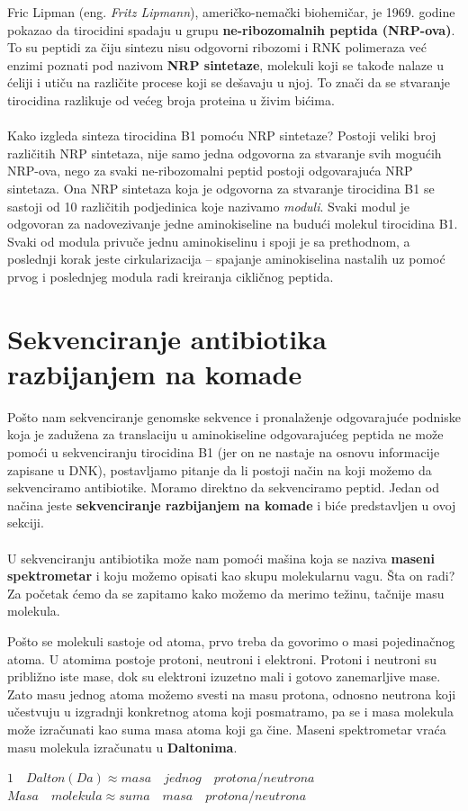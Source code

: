 Fric Lipman (eng. \textit{Fritz Lipmann}), američko-nemački biohemičar, je 1969. godine  pokazao da tirocidini spadaju u grupu \textbf{ne-ribozomalnih peptida (NRP-ova)}. To su peptidi za čiju sintezu nisu odgovorni ribozomi i RNK polimeraza već enzimi poznati pod nazivom \textbf{NRP sintetaze}, molekuli koji se takođe nalaze u ćeliji i utiču na različite procese koji se dešavaju u njoj. To znači da se stvaranje tirocidina razlikuje od većeg broja proteina u živim bićima. 
\\\\
\indent Kako izgleda sinteza tirocidina B1 pomoću NRP sintetaze? Postoji veliki broj različitih NRP sintetaza, nije samo jedna odgovorna za stvaranje svih mogućih NRP-ova, nego za svaki ne-ribozomalni peptid postoji odgovarajuća NRP sintetaza. Ona NRP sintetaza koja je odgovorna za stvaranje tirocidina B1 se sastoji od 10 različitih podjedinica koje nazivamo \textit{moduli}. Svaki modul je odgovoran za nadovezivanje jedne aminokiseline na budući molekul tirocidina B1. Svaki od modula privuče jednu aminokiselinu i spoji je sa prethodnom, a poslednji korak jeste cirkularizacija -- spajanje aminokiselina nastalih uz pomoć prvog i poslednjeg modula radi kreiranja cikličnog peptida.

\section{Sekvenciranje antibiotika razbijanjem na komade} \label{razbijanje}

Pošto nam sekvenciranje genomske sekvence i pronalaženje odgovarajuće podniske koja je zadužena za translaciju u aminokiseline odgovarajućeg peptida ne može pomoći u sekvenciranju tirocidina B1 (jer on ne nastaje na osnovu informacije zapisane u DNK), postavljamo pitanje da li postoji način na koji možemo da sekvenciramo antibiotike. Moramo direktno da sekvenciramo peptid. Jedan od načina jeste \textbf{sekvenciranje razbijanjem na komade} i biće predstavljen u ovoj sekciji.
\\
\\
\indent U sekvenciranju antibiotika može nam pomoći mašina koja se naziva \textbf{maseni spektrometar} i koju možemo opisati kao skupu molekularnu vagu. Šta on radi? Za početak ćemo da se zapitamo kako možemo da merimo težinu, tačnije masu molekula. 

Pošto se molekuli sastoje od atoma, prvo treba da govorimo o masi pojedinačnog atoma. U atomima postoje protoni, neutroni i elektroni. Protoni i neutroni su približno iste mase, dok su elektroni izuzetno mali i gotovo zanemarljive mase. Zato masu jednog atoma možemo svesti na masu protona, odnosno neutrona koji učestvuju u izgradnji konkretnog atoma koji posmatramo, pa se i masa molekula može izračunati kao suma masa atoma koji ga čine. Maseni spektrometar vraća masu molekula izračunatu u \textbf{Daltonima}. 
\begin{center}
$1 \quad Dalton (Da) \approx masa \quad jednog \quad protona/neutrona$ \\
$Masa \quad molekula \approx suma \quad masa \quad protona/neutrona$
\end{center}

